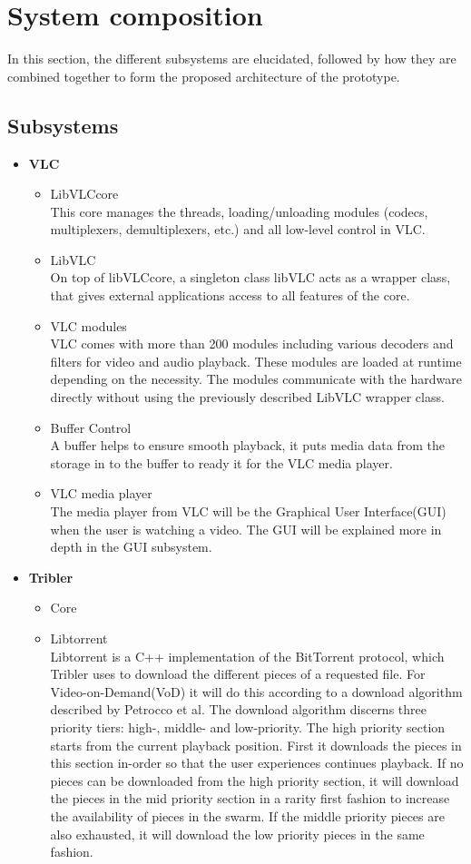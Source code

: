 \section{System composition}
In this section, the different subsystems are elucidated, followed by how they are combined together to form the proposed architecture of the prototype.
\subsection{Subsystems}
\begin{itemize}
\item \textbf{VLC}
	\begin{itemize}
		\item LibVLCcore\\
This core manages the threads, loading/unloading modules (codecs, multiplexers, demultiplexers, etc.) and all low-level control in VLC.
		\item LibVLC\\
On top of libVLCcore, a singleton class libVLC acts as a wrapper class, that gives external applications access to all features of the core.
		\item VLC modules\\
VLC comes with more than 200 modules including various decoders and filters for video and audio playback. These modules are loaded at runtime depending on the necessity. The modules communicate with the hardware directly without using the previously described LibVLC wrapper class.
		\item Buffer Control\\
A buffer helps to ensure smooth playback, it puts media data from the storage in to the buffer to ready it for the VLC media player.
		\item VLC media player\\
The media player from VLC will be the Graphical User Interface(GUI) when the user is watching a video. The GUI will be explained more in depth in the GUI subsystem.
	\end{itemize}
\item \textbf{Tribler}
	\begin{itemize}
		\item Core\\
		\item Libtorrent\\
Libtorrent is a C++ implementation of the BitTorrent protocol, which Tribler uses to download the different pieces of a requested file. For Video-on-Demand(VoD) it will do this according to a download algorithm described by Petrocco et al\cite{libswift12}. The download algorithm discerns three priority tiers: high-, middle- and low-priority. The high priority section starts from the current playback position. First it downloads the pieces in this section in-order so that the user experiences continues playback. If no pieces can be downloaded from the high priority section, it will download the pieces in the mid priority section in a rarity first fashion to increase the availability of pieces in the swarm. If the middle priority pieces are also exhausted, it will download the low priority pieces in the same fashion. 

\end{itemize}
\end{itemize}

